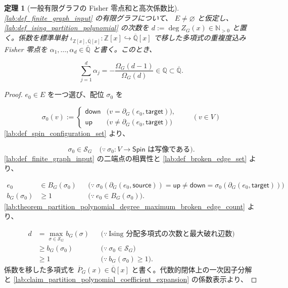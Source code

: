 \documentclass[11pt,a4paper]{article}
\newtheorem{theorem}[definition]{定理}
\theoremstyle{remark}
\begin{document}
\begin{theorem}[一般有限グラフの Fisher 零点和と高次係数比]\label{lab:theorem_fisher_zero_sum_coefficient_ratio}
\cref{lab:def_finite_graph_input}
 の有限グラフについて、
$E\ne\varnothing$
 と仮定し、
\cref{lab:def_ising_partition_polynomial}
 の次数を 
$d:=\deg Z_G(x)\in\mathbb N_{>0}$
 と置く。係数を標準単射 
$\iota_{\mathbb Z[x],\overline{\mathbb Q}[x]}:\mathbb Z[x]\hookrightarrow\overline{\mathbb Q}[x]$
 で移した多項式の重複度込み Fisher 零点を 
$\alpha_1,\ldots,\alpha_d\in\overline{\mathbb Q}$
 と書く。このとき、

\[\sum_{j=1}^{d}\alpha_j
=
-\frac{\Omega_G(d-1)}{\Omega_G(d)}
\in\mathbb Q
\subset\overline{\mathbb Q}.\]
\end{theorem}
\begin{proof}
$e_0\in E$
 を一つ選び、配位 
$\sigma_0$
 を

\[\sigma_0(v):=
\begin{cases}
  \mathsf{down} & \bigl(v=\partial_G(e_0,\mathsf{target})\bigr),\\
  \mathsf{up} & \bigl(v\ne\partial_G(e_0,\mathsf{target})\bigr)
\end{cases}
\qquad(v\in V)\]
\cref{lab:def_spin_configuration_set}
 より、

\[\sigma_0\in\mathcal S_G
\quad\bigl(\because\ \sigma_0:V\to\mathsf{Spin}\text{ は写像である}\bigr).\]
\cref{lab:def_finite_graph_input}
 の二端点の相異性と 
\cref{lab:def_broken_edge_set}
 より、

\[\begin{aligned}
e_0
&\in B_G(\sigma_0)
&&\bigl(\because\ \sigma_0(\partial_G(e_0,\mathsf{source}))=\mathsf{up}\ne\mathsf{down}=\sigma_0(\partial_G(e_0,\mathsf{target}))\bigr)\\
b_G(\sigma_0)
&\ge1
&&\bigl(\because\ e_0\in B_G(\sigma_0)\bigr).
\end{aligned}\]
\cref{lab:theorem_partition_polynomial_degree_maximum_broken_edge_count}
 より、

\[\begin{aligned}
d
&=\max_{\sigma\in\mathcal S_G}b_G(\sigma)
&&\bigl(\because\ \text{Ising 分配多項式の次数と最大破れ辺数}\bigr)\\
&\ge b_G(\sigma_0)
&&\bigl(\because\ \sigma_0\in\mathcal S_G\bigr)\\
&\ge1
&&\bigl(\because\ b_G(\sigma_0)\ge1\bigr).
\end{aligned}\]
係数を移した多項式を 
$\overline P_G(x)\in\overline{\mathbb Q}[x]$
 と書く。代数的閉体上の一次因子分解と 
\cref{lab:claim_partition_polynomial_coefficient_expansion}
 の係数表示より、


\end{proof}
\end{document}
